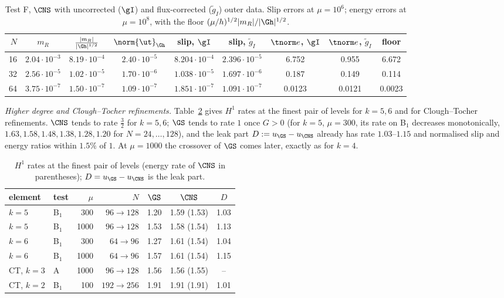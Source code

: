 \begin{table}[t]
\centering\small
\caption{Test F, $\CNS$ with uncorrected ($\gI$) and flux-corrected ($\tilde g_I$) outer data. Slip errors at $\mu=10^6$; energy errors at $\mu=10^8$, with the floor $(\mu/h)^{1/2}|m_R|/|\Gh|^{1/2}$.}\label{tab:flux}
\setlength{\tabcolsep}{3pt}
\begin{tabular}{rcccccccc}
\toprule
$N$ & $m_R$ & $\frac{|m_R|}{|\Gh|^{1/2}}$ & $\norm{\ut}_{\Gh}$ & slip, $\gI$ & slip, $\tilde g_I$ & $\tnorm e$, $\gI$ & $\tnorm e$, $\tilde g_I$ & floor\\
\midrule
16 & $2.04\cdot10^{-3}$ & $8.19\cdot10^{-4}$ & $2.40\cdot10^{-5}$ & $8.204\cdot10^{-4}$ & $2.396\cdot10^{-5}$ & 6.752 & 0.955 & 6.672\\
32 & $2.56\cdot10^{-5}$ & $1.02\cdot10^{-5}$ & $1.70\cdot10^{-6}$ & $1.038\cdot10^{-5}$ & $1.697\cdot10^{-6}$ & 0.187 & 0.149 & 0.114\\
64 & $3.75\cdot10^{-7}$ & $1.50\cdot10^{-7}$ & $1.09\cdot10^{-7}$ & $1.851\cdot10^{-7}$ & $1.091\cdot10^{-7}$ & 0.0123 & 0.0121 & 0.0023\\
\bottomrule
\end{tabular}
\end{table}

\emph{Higher degree and Clough--Tocher refinements.} Table~\ref{tab:ratesv3} gives $H^1$ rates at the finest pair of levels for $k=5,6$ and for Clough--Tocher refinements. $\CNS$ tends to rate $\frac32$ for $k=5,6$; $\GS$ tends to rate $1$ once $G>0$ (for $k=5$, $\mu=300$, its rate on B$_1$ decreases monotonically, $1.63,1.58,1.48,1.38,1.28,1.20$ for $N=24,\dots,128$), and the leak part $D:=u_{\GS}-u_{\CNS}$ already has rate $1.03$--$1.15$ and normalised slip and energy ratios within $1.5\%$ of $1$. At $\mu=1000$ the crossover of $\GS$ comes later, exactly as for $k=4$.

\begin{table}[t]
\centering\small
\caption{$H^1$ rates at the finest pair of levels (energy rate of $\CNS$ in parentheses); $D=u_{\GS}-u_{\CNS}$ is the leak part.}\label{tab:ratesv3}
\begin{tabular}{llrrccc}
\toprule
element & test & $\mu$ & $N$ & $\GS$ & $\CNS$ & $D$\\
\midrule
$k=5$ & B$_1$ & 300 & $96\to128$ & 1.20 & 1.59 (1.53) & 1.03\\
$k=5$ & B$_1$ & 1000 & $96\to128$ & 1.53 & 1.58 (1.54) & 1.13\\
$k=6$ & B$_1$ & 300 & $64\to96$ & 1.27 & 1.61 (1.54) & 1.04\\
$k=6$ & B$_1$ & 1000 & $64\to96$ & 1.57 & 1.61 (1.54) & 1.15\\
CT, $k=3$ & A & 1000 & $96\to128$ & 1.56 & 1.56 (1.55) & --\\
CT, $k=2$ & B$_1$ & 100 & $192\to256$ & 1.91 & 1.91 (1.91) & 1.01\\
\bottomrule
\end{tabular}
\end{table}

